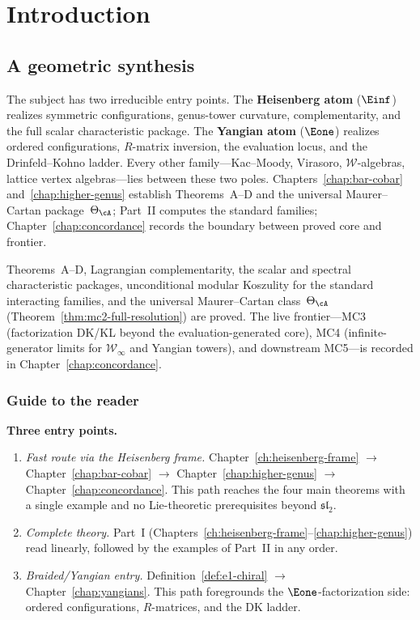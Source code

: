 \chapter{Introduction}

\section{A geometric synthesis}
\label{sec:volume-one-route}

The subject has two irreducible entry points.  The \textbf{Heisenberg atom} ($\Einf$) realizes symmetric configurations, genus-tower curvature, complementarity, and the full scalar characteristic package.  The \textbf{Yangian atom} ($\Eone$) realizes ordered configurations, $R$-matrix inversion, the evaluation locus, and the Drinfeld--Kohno ladder.  Every other family---Kac--Moody, Virasoro, $\mathcal{W}$-algebras, lattice vertex algebras---lies between these two poles.  Chapters~\ref{chap:bar-cobar} and~\ref{chap:higher-genus} establish Theorems~A--D and the universal Maurer--Cartan package~$\Theta_\cA$; Part~II computes the standard families; Chapter~\ref{chap:concordance} records the boundary between proved core and frontier.

Theorems~A--D, Lagrangian complementarity, the scalar and spectral
characteristic packages, unconditional modular Koszulity for the
standard interacting families, and the universal Maurer--Cartan
class~$\Theta_\cA$
(Theorem~\ref{thm:mc2-full-resolution}) are proved.%
\label{rem:two-strata}
The live frontier---MC3 (factorization DK/KL beyond the
evaluation-generated core), MC4 (infinite-generator limits for
$\mathcal{W}_\infty$ and Yangian towers), and downstream
MC5---is recorded in Chapter~\ref{chap:concordance}.

\subsection*{Guide to the reader}
\label{subsec:guide-to-reader}

\noindent\textbf{Three entry points.}
\begin{enumerate}[label=\textup{(\alph*)}]
\item \emph{Fast route via the Heisenberg frame.}
  Chapter~\ref{ch:heisenberg-frame} $\to$
  Chapter~\ref{chap:bar-cobar} $\to$
  Chapter~\ref{chap:higher-genus} $\to$
  Chapter~\ref{chap:concordance}.
  This path reaches the four main theorems with a single
  example and no Lie-theoretic prerequisites beyond $\mathfrak{sl}_2$.
\item \emph{Complete theory.}
  Part~I (Chapters~\ref{ch:heisenberg-frame}--\ref{chap:higher-genus})
  read linearly,
  followed by the examples of Part~II in any order.
\item \emph{Braided/Yangian entry.}
  Definition~\ref{def:e1-chiral} $\to$
  Chapter~\ref{chap:yangians}.
  This path foregrounds the $\Eone$-factorization side:
  ordered configurations, $R$-matrices, and the DK ladder.
\end{enumerate}

